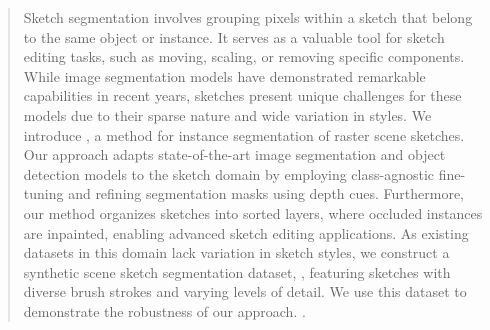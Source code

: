 \begin{abstract}
Sketch segmentation involves grouping pixels within a sketch that belong to the same object or instance. It serves as a valuable tool for sketch editing tasks, such as moving, scaling, or removing specific components. While image segmentation models have demonstrated remarkable capabilities in recent years, sketches present unique challenges for these models due to their sparse nature and wide variation in styles.
We introduce \methodname{}, a method for instance segmentation of raster scene sketches. Our approach adapts state-of-the-art image segmentation and object detection models to the sketch domain by employing class-agnostic fine-tuning and refining segmentation masks using depth cues. Furthermore, our method organizes sketches into sorted layers, where occluded instances are inpainted, enabling advanced sketch editing applications.
As existing datasets in this domain lack variation in sketch styles, we construct a synthetic scene sketch segmentation dataset, \datasetname{}, featuring sketches with diverse brush strokes and varying levels of detail. We use this dataset to demonstrate the robustness of our approach. .




\end{abstract}
